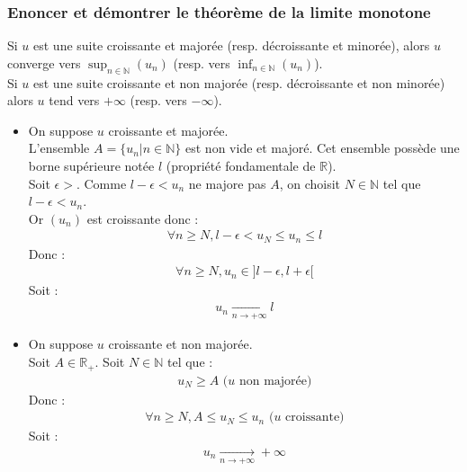 \documentclass[titlepage, twoside]{report}
\begin{document}
\subsubsection{Enoncer et démontrer le théorème de la limite monotone}
\begin{tcolorbox}[title=Théorème 14.50, title filled=false, colframe=orange, colback=orange!10!white]
    Si $u$ est une suite croissante et majorée (resp. décroissante et minorée), alors $u$ converge vers $\sup_{n\in \mathbb{N}}(u_n)$ (resp. vers $\inf_{n\in \mathbb{N}}(u_n)$). \\
    Si $u$ est une suite croissante et non majorée (resp. décroissante et non minorée) alors $u$ tend vers $+\infty$ (resp. vers $-\infty$). 
\end{tcolorbox}

\begin{itemize}
    \item On suppose $u$ croissante et majorée. \\
    L'ensemble $A = \{ u_n | n\in \mathbb{N} \}$ est non vide et majoré. Cet ensemble possède une borne supérieure notée $l$ (propriété fondamentale de $\mathbb{R}$). \\
    Soit $\epsilon > $. Comme $l - \epsilon < u_n$ ne majore pas $A$, on choisit $N \in \mathbb{N}$ tel que $l - \epsilon < u_n$. \\
    Or $(u_n)$ est croissante donc : 
    \begin{align*}
        \forall n \geq N, l - \epsilon < u_N \leq u_n \leq l
    \end{align*}
    Donc : 
    \begin{align*}
        \forall n \geq N, u_n \in ]l-\epsilon, l+\epsilon[
    \end{align*}
    Soit : 
    \begin{align*}
        \boxed{u_n \underset{n \to +\infty}{\longrightarrow} l}
    \end{align*}

    \item On suppose $u$ croissante et non majorée. \\
    Soit $A \in \mathbb{R}_+$. Soit $N \in \mathbb{N}$ tel que : 
    \begin{align*}
        u_N \geq A \text{ ($u$ non majorée)}
    \end{align*}
    Donc : 
    \begin{align*}
        \forall n \geq N, A \leq u_N \leq u_n \text{ ($u$ croissante)}
    \end{align*}
    Soit : 
    \begin{align*}
        \boxed{u_n \underset{n \to +\infty}{\longrightarrow} +\infty}
    \end{align*}
\end{itemize}
\end{document}
